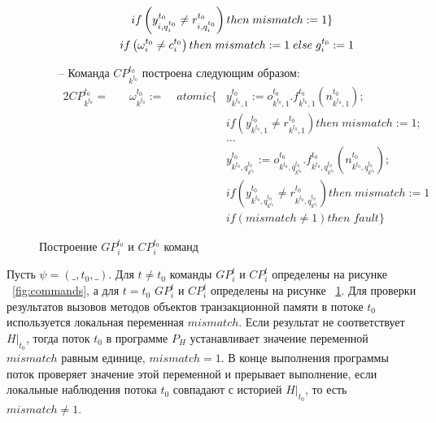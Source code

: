 \begin{myproof}
\begin{figure}
\begin{itemize}
\begin{alignat}{2}
         &&& if \left (y^{t_0}_{i,q^{t_0}_i} \neq r^{t_0}_{i,q^{t_0}_i}\right) then \; mismatch := 1\} \nonumber \\
         &\quad \mathrlap{if \left(\omega^{t_0}_{i} \neq c^{t_0}_{i} \right) then \; mismatch := 1 \; else \; g^{t_0}_{i} := 1} \nonumber
\end{alignat}
\item[--] Команда $CP^{t_0}_{k^{t_0}}$ построена следующим образом:
\begin{alignat}{2}
     CP^{t_0}_{k^{t_0}} =&\quad \omega^{t_0}_{k^{t_0}} := &\; atomic\{&y^{t_0}_{k^{t_0},1} := o^{t_0}_{k^{t_0},1}.f^{t_0}_{k^{t_0},1}(n^{t_0}_{k^{t_0},1}); \nonumber \\ 
     &&& if \left (y^{t_0}_{k^{t_0},1} \neq r^{t_0}_{k^{t_0},1}\right) then \; mismatch := 1; \nonumber \\
         &           &&\ldots \nonumber \\
         & && y^{t_0}_{k^{t_0},q^{t_0}_{k^{t_0}}} := o^{t_0}_{k^{t_0},q^{t_0}_{k^{t_0}}}.f^{t_0}_{k^{t_0},q^{t_0}_{k^{t_0}}}(n^{t_0}_{k^{t_0},q^{t_0}_{k^{t_0}}}); 
         \nonumber \\ 
         &&& if \left (y^{t_0}_{k^{t_0},q^{t_0}_{k^{t_0}}} \neq r^{t_0}_{k^{t_0},q^{t_0}_{k^{t_0}}}\right) then \; mismatch := 1 \nonumber \\
         &&& if \left(mismatch \neq 1 \right) then \; fault \} \nonumber
\end{alignat}
\end{itemize}
\caption{Построение $GP^{t_0}_i$ и $CP^{t_0}_i$ команд}
\label{fig:commands_t0}
\end{figure}

Пусть $\psi = (\_,t_0,\_)$. Для $t \neq t_0$ команды $GP^t_i$ и $CP^t_i$ определены на рисунке ~\ref{fig:commands}, а для $t = t_0$ $GP^t_i$ и $CP^t_i$ определены на рисунке ~\ref{fig:commands_t0}. Для проверки результатов вызовов методов объектов транзакционной памяти в потоке $t_0$ используется локальная переменная $mismatch$. Если результат не соответствует $H|_{t_0}$, тогда поток $t_0$ в программе $P_H$ устанавливает значение переменной $mismatch$ равным единице, $mismatch = 1$. В конце выполнения программы поток проверяет значение этой переменной и прерывает выполнение, если локальные наблюдения потока $t_0$ совпадают с историей $H|_{t_0}$, то есть $mismatch \neq 1$.


\end{myproof}
